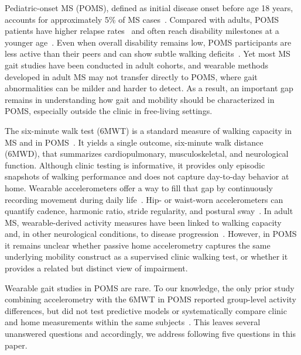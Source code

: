 \documentclass{article}
\begin{document}
Pediatric-onset MS (POMS), defined as initial disease onset before age 18 years, accounts for approximately 5\% of MS cases~\cite{siddiqui2024clinical}. Compared with adults, POMS patients have higher relapse rates~\cite{gorman2009increased} and often reach disability milestones at a younger age~\cite{renoux2007natural, mckay2019long}. Even when overall disability remains low, POMS participants are less active than their peers and can show subtle walking deficits~\cite{brenton2022sixminute}. Yet most MS gait studies have been conducted in adult cohorts, and wearable methods developed in adult MS may not transfer directly to POMS, where gait abnormalities can be milder and harder to detect. As a result, an important gap remains in understanding how gait and mobility should be characterized in POMS, especially outside the clinic in free-living settings.

The six-minute walk test (6MWT) is a standard measure of walking capacity in MS and in POMS~\cite{goldman2008evaluation, ats2002guidelines, brenton2022sixminute}. It yields a single outcome, six-minute walk distance (6MWD), that summarizes cardiopulmonary, musculoskeletal, and neurological function. Although clinic testing is informative, it provides only episodic snapshots of walking performance and does not capture day-to-day behavior at home. Wearable accelerometers offer a way to fill that gap by continuously recording movement during daily life~\cite{alexander2021wearable, karas2023systematic}. Hip- or waist-worn accelerometers can quantify cadence, harmonic ratio, stride regularity, and postural sway~\cite{sosnoff2012quantifying, igarashi2024accelerometer, moon2017monitoring, mancini2012isway, meyer2024assessing, meyer2023chest}. In adult MS, wearable-derived activity measures have been linked to walking capacity~\cite{motl2011accelerometry, silva2024comprehensive, fitzgerald2026activity, bourjeily2025accelerometry} and, in other neurological conditions, to disease progression~\cite{gupta2023athome}. However, in POMS it remains unclear whether passive home accelerometry captures the same underlying mobility construct as a supervised clinic walking test, or whether it provides a related but distinct view of impairment.

Wearable gait studies in POMS are rare. To our knowledge, the only prior study combining accelerometry with the 6MWT in POMS reported group-level activity differences, but did not test predictive models or systematically compare clinic and home measurements within the same subjects~\cite{brenton2022sixminute}. This leaves several unanswered questions and accordingly, we address following five questions in this paper.
\end{document}
